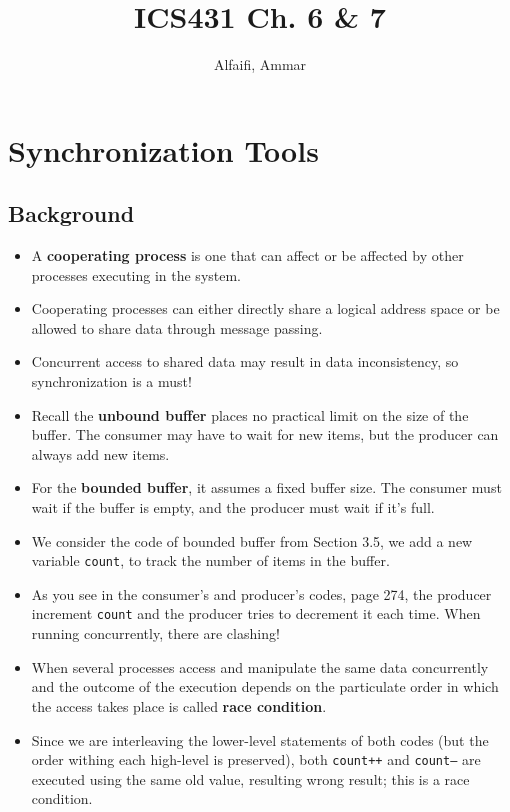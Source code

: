 \documentclass{report}
\title{ICS431 Ch. 6 \& 7}
\author{Alfaifi, Ammar}
\date{}
\def\code#1{\texttt{#1}}
\begin{document}
\maketitle


\chapter{Synchronization Tools}%
\label{sec:synchronization tool}

\section{Background}

\begin{itemize}
	\item A \textbf{cooperating process} is one that can affect or be affected by other processes
	      executing in the system.
	\item Cooperating processes can either directly share a logical address space or be allowed
	      to share data through message passing.
	\item Concurrent access to shared data may result in data inconsistency, so synchronization is a must!
	\item Recall the \textbf{unbound buffer} places no practical limit on the size of the buffer. The consumer
	      may have to wait for new items, but the producer can always add new items.
	\item For the \textbf{bounded buffer}, it assumes a fixed buffer size. The consumer must wait if the buffer is
	      empty, and the producer must wait if it's full.
	\item We consider the code of bounded buffer from Section 3.5, we add a new variable \code{count}, to
	      track the number of items in the buffer.
	\item As you see in the consumer's and producer's codes, page 274, the producer increment \code{count} and
	      the producer tries to decrement it each time. When running concurrently, there are clashing!
	\item When several processes access and manipulate the same data concurrently and the
	      outcome of the execution depends on the particulate order in which the access takes place is called
	      \textbf{race condition}.
	\item Since we are interleaving the lower-level statements of both codes (but the order withing each
	      high-level is preserved), both \code{count++} and \code{count--} are executed using the same old value,
	      resulting wrong result; this is a race condition.
\end{itemize}
\end{document}
